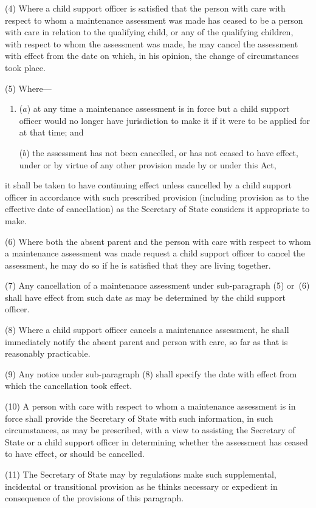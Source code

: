 \documentclass[12pt,a4paper]{article}
\begin{document}
(4) Where a child support officer is satisfied that the person with care with respect to whom a maintenance assessment was made has ceased to be a person with care in relation to the qualifying child, or any of the qualifying children, with respect to whom the assessment was made, he may cancel the assessment with effect from the date on which, in his opinion, the change of circumstances took place.

(5) Where—
\begin{enumerate}\item[]
($a$) at any time a maintenance assessment is in force but a child support officer would no longer have jurisdiction to make it if it were to be applied for at that time; and

($b$) the assessment has not been cancelled, or has not ceased to have effect, under or by virtue of any other provision made by or under this Act,
\end{enumerate}
it shall be taken to have continuing effect unless cancelled by a child support officer in accordance with such prescribed provision (including provision as to the effective date of cancellation) as the Secretary of State considers it appropriate to make.

(6) Where both the absent parent and the person with care with respect to whom a maintenance assessment was made request a child support officer to cancel the assessment, he may do so if he is satisfied that they are living together.

(7) Any cancellation of a maintenance assessment under sub-paragraph (5)  or~(6)  shall have effect from such date as may be determined by the child support officer.

(8) Where a child support officer cancels a maintenance assessment, he shall immediately notify the absent parent and person with care, so far as that is reasonably practicable.

(9) Any notice under sub-paragraph (8)  shall specify the date with effect from which the cancellation took effect.

(10) A person with care with respect to whom a maintenance assessment is in force shall provide the Secretary of State with such information, in such circumstances, as may be prescribed, with a view to assisting the Secretary of State or a child support officer in determining whether the assessment has ceased to have effect, or should be cancelled.

(11) The Secretary of State may by regulations make such supplemental, incidental or transitional provision as he thinks necessary or expedient in consequence of the provisions of this paragraph.
\end{document}
